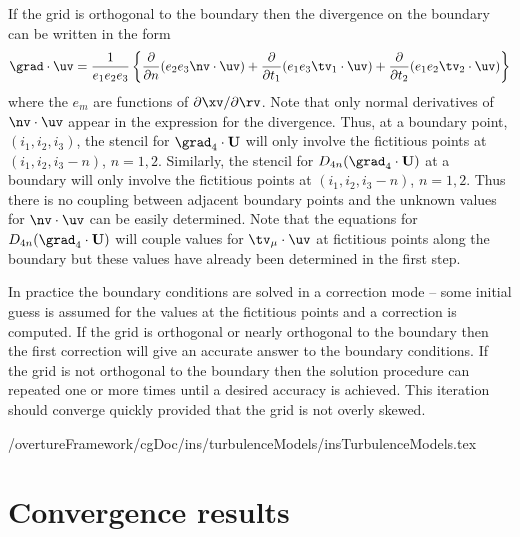 \documentclass[10pt]{article}
\newcommand{\cgDoc}{\homeHenshaw/overtureFramework/cgDoc}
\begin{document}
If the grid is orthogonal to the boundary then the divergence on the
boundary can be written in the form
$$
    \grad\cdot\uv = {1\over e_1 e_2 e_3} \left\{
          {\partial \over \partial n} ( e_2 e_3 \nv\cdot\uv )
        + {\partial \over \partial t_1} ( e_1 e_3 \tv_1 \cdot\uv )
        + {\partial \over \partial t_2} ( e_1 e_2 \tv_2 \cdot\uv )
              \right \}
$$
where the $e_m$ are functions of $\partial \xv / \partial \rv$.
Note that only normal
derivatives of $\nv\cdot\uv$ appear in the expression for the divergence.
Thus, at a boundary point, $(i_1,i_2,i_3)$, the stencil for
$\grad_4\cdot\uvd$
will only involve the fictitious points at
$(i_1,i_2,i_3-n)$, $n=1,2$.
Similarly, the stencil for
$D_{4n}(\grad_4\cdot\uvd)$ at a boundary
will only involve the fictitious points at
$(i_1,i_2,i_3-n)$, $n=1,2$.
Thus there is no coupling between adjacent boundary points and the
unknown values for $\nv\cdot\uv$ can be easily determined.  Note that
the equations for $D_{4n}(\grad_4\cdot\uvd)$ will couple values for
$\tv_\mu\cdot\uv$ at fictitious points along the boundary
but these values have already been determined in the first step.
 
In practice the boundary conditions are solved in a correction mode --
some initial guess is assumed for the values at the fictitious points
and a correction is computed.  If the grid is orthogonal or nearly
orthogonal to the boundary then the first correction will give an
accurate answer to the boundary conditions.  If the grid is not
orthogonal to the boundary then the solution procedure can repeated
one or more times until a desired accuracy is achieved. This
iteration should converge quickly provided that the grid is not overly
skewed.

\clearpage
 \cgDoc/ins/turbulenceModels/insTurbulenceModels.tex

\clearpage



\clearpage



\clearpage
\section{Convergence results}
\end{document}
